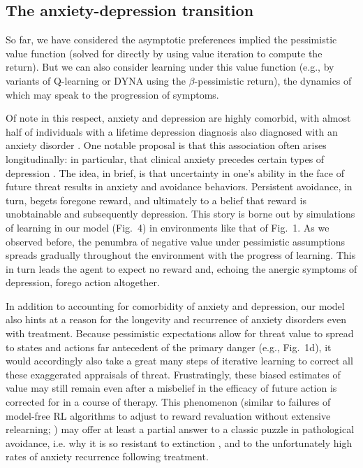 \documentclass[11pt]{article} %
\begin{document}
\subsection{The anxiety-depression transition}

So far, we have considered the asymptotic preferences implied the pessimistic value function (solved for directly by using value iteration to compute the return). But we can also consider learning under this value function (e.g., by variants of Q-learning\citep{SuttonBarto2018} or DYNA\citep{sutton1991} using the $\beta$-pessimistic return), the dynamics of which may speak to the progression of symptoms.

Of note in this respect, anxiety and depression are highly comorbid, with almost half of individuals with a lifetime depression diagnosis also diagnosed with an anxiety disorder \citep{kessler2015}. One notable proposal is that this association often arises longitudinally: in particular, that clinical anxiety precedes certain types of depression \citep{alloy1990, jacobson2014}. The idea, in brief, is that uncertainty in one's ability in the face of future threat results in anxiety and avoidance behaviors. Persistent avoidance, in turn, begets foregone reward, and ultimately to a belief that reward is unobtainable and subsequently depression. This story is borne out by simulations of learning in our model (Fig.~4) in environments like that of Fig.~1. As we observed before, the penumbra of negative value under pessimistic assumptions spreads gradually throughout the environment with the progress of learning. This in turn leads the agent to expect no reward and, echoing the anergic symptoms of depression, forego action altogether.

In addition to accounting for comorbidity of anxiety and depression, our model also hints at a reason for the longevity and recurrence of anxiety disorders even with treatment. Because pessimistic expectations allow for threat value to spread to states and actions far antecedent of the primary danger (e.g., Fig.~1d), it would accordingly also take a great many steps of iterative learning to correct all these exaggerated appraisals of threat. Frustratingly, these biased estimates of value may still remain even after a misbelief in the efficacy of future action is corrected for in a course of therapy. This phenomenon (similar to failures of model-free RL algorithms to adjust to reward revaluation without extensive relearning; \cite{daw2005}) may offer at least a partial answer to a classic puzzle in pathological avoidance, i.e. why it is so resistant to extinction \cite{moutoussis2018}, and to the unfortunately high rates of anxiety recurrence following treatment\citep{pittig2018}.
\end{document}
